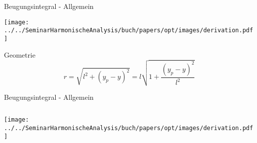 \begin{frame}{Beugungsintegral - Allgemein}
    \begin{center}
        \texttt{[image: ../../SeminarHarmonischeAnalysis/buch/papers/opt/images/derivation.pdf]}
    \end{center}
    \begin{exampleblock}{Geometrie}
        \begin{equation*}
            r
            =
            \sqrt{l^2 + (y_p-y)^2}
            =
            l \sqrt{1 + \frac{(y_p-y)^2}{l^2}}
        \end{equation*}
    \end{exampleblock}
\end{frame}

\begin{frame}{Beugungsintegral - Allgemein}
    \begin{columns}
        \begin{column}{0.475\textwidth}
            \centering
            \texttt{[image: ../../SeminarHarmonischeAnalysis/buch/papers/opt/images/derivation.pdf]}
        \end{column}


\end{columns}
\end{frame}
